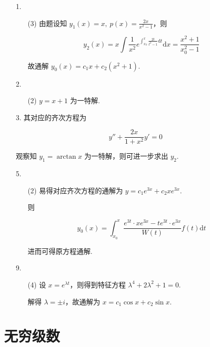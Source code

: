 \documentclass[oneside]{ctexbook} %
\begin{document}
\begin{enumerate}
    \item[1.]
    \begin{enumerate}
        \item[(3)]
        由题设知 $y_1(x) = x,\ p(x) = \frac{2x}{x^2 - 1}$，则
        
        $$
        y_2(x) = x \int \frac 1 {x^2} e^{\int_{x_0}^x \frac{2t}{t^2 - 1} \mathrm dt} \mathrm dx = \frac{x^2 + 1}{x_0^2 - 1}
        $$
        
        故通解 $y_0(x) = c_1x + c_2 (x^2 + 1)$.
    \end{enumerate}
    \item[2.]
    \begin{enumerate}
        \item[(2)]
        $y = x + 1$ 为一特解.
    \end{enumerate}
    \item[3.]
    其对应的齐次方程为
    
    $$
    y'' + \frac{2x}{1 + x^2} y' = 0
    $$
    
    观察知 $y_1 = \arctan x$ 为一特解，则可进一步求出 $y_2$.
    \item[5.]
    \begin{enumerate}
        \item[(2)]
        易得对应齐次方程的通解为 $y = c_1 e^{3x} + c_2 x e^{3x}$.
        
        则
        
        $$
        y_0(x) = \int_{x_0}^x \frac{e^{3t} \cdot xe^{3x} - te^{3t} \cdot e^{3x}}{W(t)} f(t) \mathrm dt
        $$
        
        进而可得原方程通解.
    \end{enumerate}
    \item[9.]
    \begin{enumerate}
        \item[(4)]
        设 $x = e^{\lambda t}$，则得到特征方程 $\lambda^4 + 2\lambda^2 + 1 = 0$.
        
        解得 $\lambda = \pm i$，故通解为 $x = c_1 \cos x + c_2 \sin x$.
    \end{enumerate}
    
\end{enumerate}

\newpage

\chapter{无穷级数}
\end{document}
